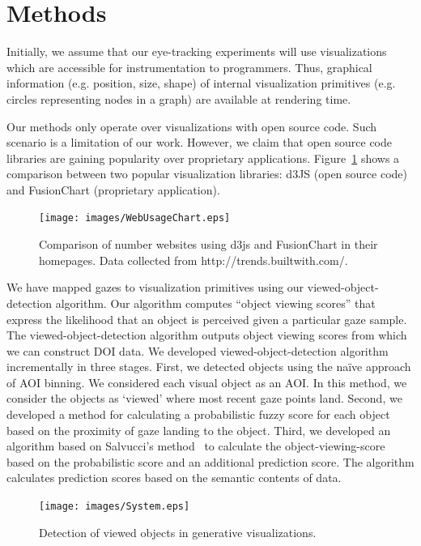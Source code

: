 \section{Methods}
\label{sec:DOICollectionMethods}
Initially, we assume that our eye-tracking experiments will use visualizations which are accessible for instrumentation to programmers. Thus, graphical information (e.g. position, size, shape) of internal visualization primitives (e.g. circles representing nodes in a graph) are available at rendering time. 

Our methods only operate over visualizations with open source code. Such scenario is a limitation of our work. However, we claim that open source code libraries are gaining popularity over proprietary applications. Figure~\ref{fig:WebUsageChart} shows a comparison between two popular visualization libraries: d3JS (open source code) and FusionChart (proprietary application).

\begin{figure}[htb]
  \centering
  \texttt{[image: images/WebUsageChart.eps]}
  \caption{Comparison of number websites using d3js and FusionChart in their homepages. Data collected from http://trends.builtwith.com/. }
	\label{fig:WebUsageChart}
\end{figure}

We have mapped gazes to visualization primitives using our viewed-object-detection algorithm. Our algorithm computes ``object viewing scores'' that express the likelihood that an object is perceived given a particular gaze sample. The viewed-object-detection algorithm outputs object viewing scores from which we can construct DOI data. We developed viewed-object-detection algorithm incrementally in three stages. First, we detected objects using the na\"{i}ve approach of AOI binning. We considered each visual object as an AOI. In this method, we consider the objects as `viewed' where most recent gaze points land. Second, we developed a method for calculating a probabilistic fuzzy score for each object based on the proximity of gaze landing to the object. Third, we developed an algorithm based on Salvucci's method~\cite{Sal00} to calculate the object-viewing-score based on the probabilistic score and an additional prediction score. The algorithm calculates prediction scores based on the semantic contents of data. 

\begin{figure}[htb]
  \centering
  \texttt{[image: images/System.eps]}
  \caption{Detection of viewed objects in generative visualizations.}
	\label{fig:System}
\end{figure}

